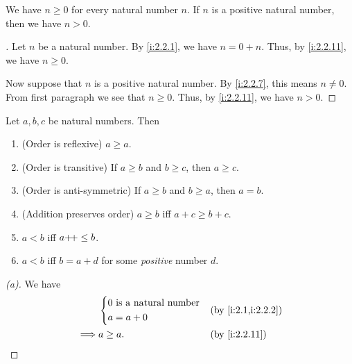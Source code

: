 \begin{ac}\label{i:ac:2.2.4}
  We have \(n \geq 0\) for every natural number \(n\).
  If \(n\) is a positive natural number, then we have \(n > 0\).
\end{ac}

\begin{proof}[]
  Let \(n\) be a natural number.
  By \cref{i:2.2.1}, we have \(n = 0 + n\).
  Thus, by \cref{i:2.2.11}, we have \(n \geq 0\).

  Now suppose that \(n\) is a positive natural number.
  By \cref{i:2.2.7}, this means \(n \neq 0\).
  From first paragraph we see that \(n \geq 0\).
  Thus, by \cref{i:2.2.11}, we have \(n > 0\).
\end{proof}

\begin{prop}\label{i:2.2.12}
  Let \(a, b, c\) be natural numbers.
  Then
  \begin{enumerate}
    \item (Order is reflexive) \(a \geq a\).
    \item (Order is transitive) If \(a \geq b\) and \(b \geq c\), then \(a \geq c\).
    \item (Order is anti-symmetric) If \(a \geq b\) and \(b \geq a\), then \(a = b\).
    \item (Addition preserves order) \(a \geq b\) iff \(a + c \geq b + c\).
    \item \(a < b\) iff \(a{+}\!{+} \leq b\).
    \item \(a < b\) iff \(b = a + d\) for some \emph{positive} number \(d\).
  \end{enumerate}
\end{prop}

\begin{proof}[(a)]
  We have
  \begin{align*}
             & \begin{dcases}
                 0 \text{ is a natural number} \\
                 a = a + 0
               \end{dcases} &  & \by{i:2.1,i:2.2.2}                \\
    \implies & a \geq a.                        &  & \by{i:2.2.11}
  \end{align*}
\end{proof}

